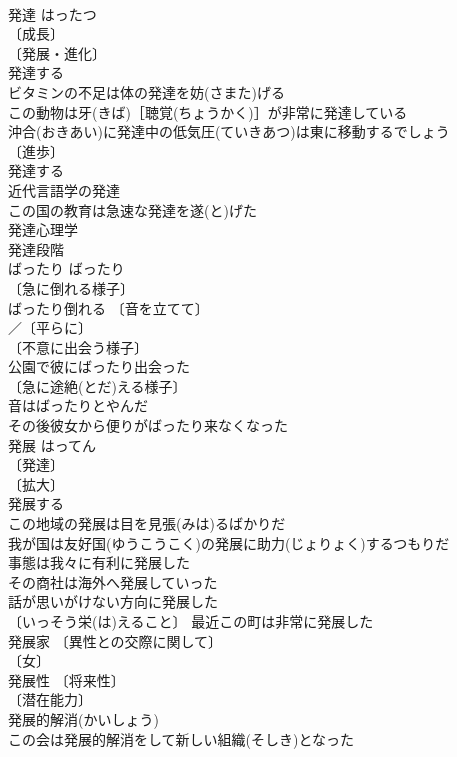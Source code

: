 \documentclass[8pt]{extreport}
\begin{document}
\begin{CJK}{UTF8}{min}
\\	発達	はったつ	
\\	〔成長〕
\\	〔発展・進化〕
\\	発達する 
\\	ビタミンの不足は体の発達を妨(さまた)げる 
\\	この動物は牙(きば)［聴覚(ちょうかく)］が非常に発達している 
\\	沖合(おきあい)に発達中の低気圧(ていきあつ)は東に移動するでしょう 
\\	〔進歩〕
\\	発達する 
\\	近代言語学の発達 
\\	この国の教育は急速な発達を遂(と)げた 
\\	発達心理学 
\\	発達段階 
\\	ばったり	ばったり	
\\	〔急に倒れる様子〕　
\\	ばったり倒れる 〔音を立てて〕
\\	／〔平らに〕
\\	〔不意に出会う様子〕　
\\	公園で彼にばったり出会った 
\\	〔急に途絶(とだ)える様子〕　
\\	音はばったりとやんだ 
\\	その後彼女から便りがばったり来なくなった 
\\	発展	はってん	
\\	〔発達〕
\\	〔拡大〕
\\	発展する 
\\	この地域の発展は目を見張(みは)るばかりだ 
\\	我が国は友好国(ゆうこうこく)の発展に助力(じょりょく)するつもりだ 
\\	事態は我々に有利に発展した 
\\	その商社は海外へ発展していった 
\\	話が思いがけない方向に発展した 
\\	〔いっそう栄(は)えること〕 最近この町は非常に発展した 
\\	発展家 〔異性との交際に関して〕
\\	〔女〕
\\	発展性 〔将来性〕
\\	〔潜在能力〕
\\	発展的解消(かいしょう)
\\	この会は発展的解消をして新しい組織(そしき)となった 

\end{CJK}
\end{document}
